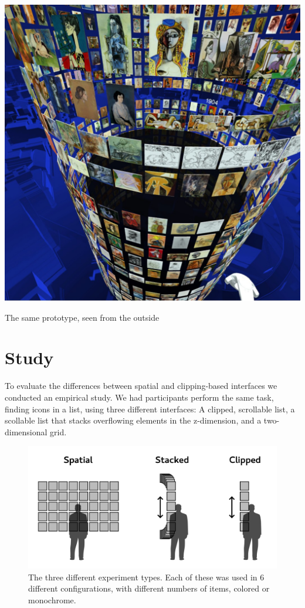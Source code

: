 \documentclass{tufte-book} %
\begin{document}
\begin{marginfigure}
  \includegraphics[width=\linewidth]{picassooutside.jpg}
  \caption{The same prototype, seen from the outside}
  \label{fig:picassooutside}
\end{marginfigure}


\chapter{Study}
\label{ch:study}

To evaluate the differences between spatial and clipping-based interfaces we conducted an empirical study. We had participants perform the same task, finding icons in a list, using three different interfaces: A clipped, scrollable list, a scollable list that stacks overflowing elements in the z-dimension, and a two-dimensional grid.

\begin{figure}
  \includegraphics{types.png}
  \caption{The three different experiment types. Each of these was used in 6 different configurations, with different numbers of items, colored or monochrome.}
  \label{fig:experiement-types}
\end{figure}
\end{document}
